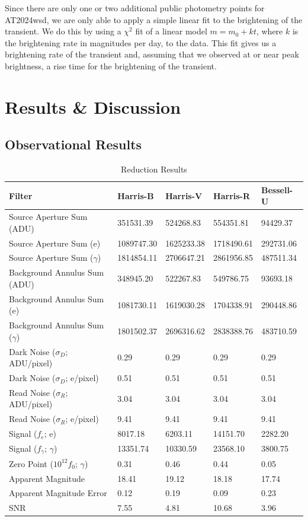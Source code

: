 \documentclass{aastex631}
\begin{document}
Since there are only one or two additional public photometry points for AT2024wsd, we are only able to apply a simple linear fit to the brightening of the transient. We do this by using a $\chi^2$ fit of a linear model $m = m_0 + kt$, where $k$ is the brightening rate in magnitudes per day, to the data. This fit gives us a brightening rate of the transient and, assuming that we observed at or near peak brightness, a rise time for the brightening of the transient. 

\section{Results \& Discussion}\label{sec:res}
\subsection{Observational Results}

\begin{table}
  \centering
  \caption{Reduction Results}
  \label{tab:res}
  \begin{tabular}{lllll}
    \hline
    Filter & Harris-B & Harris-V & Harris-R & Bessell-U \\
    \hline
    Source Aperture Sum (ADU) & 351531.39 & 524268.83 & 554351.81 & 94429.37 \\
    Source Aperture Sum (e) & 1089747.30 & 1625233.38 & 1718490.61 & 292731.06 \\
    Source Aperture Sum ($\gamma$) & 1814854.11 & 2706647.21 & 2861956.85 & 487511.34 \\
    \hline
    Background Annulus Sum (ADU) & 348945.20 & 522267.83 & 549786.75 & 93693.18 \\
    Background Annulus Sum (e) & 1081730.11 & 1619030.28 & 1704338.91 & 290448.86 \\
    Background Annulus Sum ($\gamma$) & 1801502.37 & 2696316.62 & 2838388.76 & 483710.59 \\
    \hline
    Dark Noise ($\sigma_D$; ADU/pixel) & 0.29 & 0.29 & 0.29 & 0.29 \\
    Dark Noise ($\sigma_D$; e/pixel) & 0.51 & 0.51 & 0.51 & 0.51 \\
    \hline
    Read Noise ($\sigma_R$; ADU/pixel) & 3.04 & 3.04 & 3.04 & 3.04 \\
    Read Noise ($\sigma_R$; e/pixel) & 9.41 & 9.41 & 9.41 & 9.41 \\
    \hline
    Signal ($f_e$; e) & 8017.18 & 6203.11 & 14151.70 & 2282.20 \\
    Signal ($f_\gamma$; $\gamma$) & 13351.74 & 10330.59 & 23568.10 & 3800.75 \\
    Zero Point ($10^{12}f_0$; $\gamma$) & 0.31 & 0.46 & 0.44 & 0.05 \\
    Apparent Magnitude & 18.41 & 19.12 & 18.18 & 17.74 \\
    Apparent Magnitude Error & 0.12 & 0.19 & 0.09 & 0.23 \\
    \hline
    SNR & 7.55 & 4.81 & 10.68 & 3.96 \\
    \hline
  \end{tabular}
\end{table}
\end{document}
